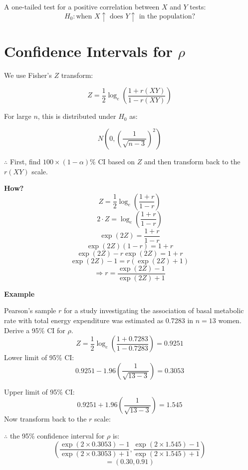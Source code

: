 \documentclass[14pt]{extarticle}
\begin{document}
\noindent
A one-tailed test for a positive correlation between $X$ and $Y$ tests:
\[
H_0: \text{when } X \uparrow \text{ does } Y \uparrow \text{ in the population?}
\]
\section*{Confidence Intervals for $\rho$}

\noindent
We use Fisher's $Z$ transform:

\[
Z = \frac{1}{2} \log_e \left( \frac{1 + r(XY)}{1 - r(XY)} \right)
\]

\noindent
For large $n$, this is distributed under $H_0$ as:

\[
N(0, \left( \frac{1}{\sqrt{n - 3}} \right)^2)
\]

\noindent $\therefore$ First, find $100 \times (1-\alpha) \%$ CI based on $Z$ and then transform back to the $r(XY)$ scale.

\noindent
\textbf{How?}
\[
Z = \frac{1}{2} \log_e \left( \frac{1 + r}{1 - r} \right)
\]
\[
2 \cdot Z = \log_e \left( \frac{1 + r}{1 - r} \right)
\]
\[
\exp(2Z) = \frac{1 + r}{1 - r}
\]
\[
\exp(2Z)(1 - r) = 1 + r
\]
\[
\exp(2Z) - r \exp(2Z) = 1 + r
\]
\[
\exp(2Z) - 1 = r(\exp(2Z) + 1)
\]
\[
\Rightarrow r = \frac{\exp(2Z) - 1}{\exp(2Z) + 1}
\]

\noindent
\textbf{Example}

\noindent
Pearson's sample $r$ for a study investigating the association of basal metabolic rate with total energy expenditure was estimated as 0.7283 in $n=13$ women. Derive a 95\% CI for $\rho$.
\[
Z = \frac{1}{2} \log_e \left( \frac{1 + 0.7283}{1 - 0.7283} \right) = 0.9251
\]
\noindent
Lower limit of 95\% CI:
\[
0.9251 - 1.96 \left( \frac{1}{\sqrt{13 - 3}} \right) = 0.3053
\]

\noindent
Upper limit of 95\% CI:
\[
0.9251 + 1.96 \left( \frac{1}{\sqrt{13 - 3}} \right) = 1.545
\]
\noindent
Now transform back to the $r$ scale:

\noindent
$\therefore$ the 95\% confidence interval for $\rho$ is:
\[
\left( \frac{\exp(2 \times 0.3053) - 1}{\exp(2 \times 0.3053) + 1}, \frac{\exp(2 \times 1.545) - 1}{\exp(2 \times 1.545) + 1} \right)
\]
\[
= (0.30, 0.91)
\]
\end{document}
